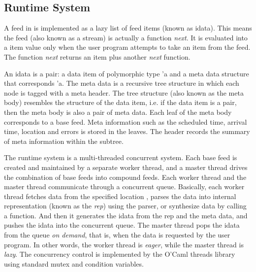 \subsection{Runtime System}
A feed in \padsd{} is implemented as a lazy list of feed
items (known as idata). This means the feed (also known as a stream) 
is actually a function {\em next}. It is evaluated into
a item value only when the user program attempts to take an
item from the feed. The function {\em next} returns an
item plus another {\em next} function. 

An idata is a pair: a data item of polymorphic type 'a and 
a meta data structure that corresponds 'a. 
The meta data is a recursive tree structure in which
each node is tagged with a meta header. 
The tree structure (also known as the meta body) resembles 
the structure of the data item, i.e.  if the data item is a pair, 
then the meta body is also a pair of meta data. Each leaf
of the meta body corresponds to a base feed. Meta information
such as the scheduled time, arrival time, location and 
errors is stored in the leaves. The header records the summary 
of meta information within the subtree. 

The \padsd{} runtime system is a multi-threaded concurrent
system. Each base feed is created and maintained by a separate 
worker thread, and a master thread drives the combination of 
base feeds into compound feeds. Each worker thread and the 
master thread communicate through a concurrent queue.
Basically, each worker thread fetches data from the specified
location , parses the data into internal representation 
(known as the {\em rep})
using the \padsml parser, or synthesize data by calling a function.
And then it generates the idata from the rep and the meta data,
and pushes the idata into the concurrent queue.
The master thread pops the idata from the queue {\em on demand}, that is,
when the data is requested by the user program. In other words,
the worker thread is {\em eager}, while the master thread is {\em lazy}.
The concurrency control is implemented by the O'Caml threads
library using standard mutex and condition variables.

